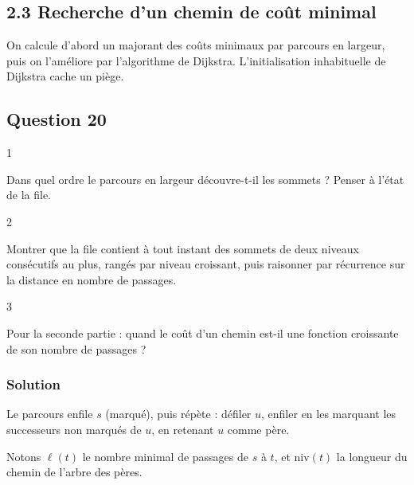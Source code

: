 \documentclass[11pt,a4paper]{article}
\begin{document}
\hypertarget{recherche-dun-chemin-de-couxfbt-minimal}{%
\subsection{2.3 Recherche d'un chemin de coût minimal}\label{recherche-dun-chemin-de-couxfbt-minimal}}

On calcule d'abord un majorant des coûts minimaux par parcours en largeur, puis on l'améliore par l'algorithme de Dijkstra. L'initialisation inhabituelle de Dijkstra cache un piège.

\hypertarget{question-20}{%
\subsection{Question 20}\label{question-20}}

\begin{indication}{1}

Dans quel ordre le parcours en largeur découvre-t-il les sommets ? Penser à l'état de la file.

\end{indication}

\begin{indication}{2}

Montrer que la file contient à tout instant des sommets de deux niveaux consécutifs au plus, rangés par niveau croissant, puis raisonner par récurrence sur la distance en nombre de passages.

\end{indication}

\begin{indication}{3}

Pour la seconde partie : quand le coût d'un chemin est-il une fonction croissante de son nombre de passages ?

\end{indication}

\hypertarget{solution-19}{%
\subsubsection{Solution}\label{solution-19}}

Le parcours enfile \(s\) (marqué), puis répète : défiler \(u\), enfiler en les marquant les successeurs non marqués de \(u\), en retenant \(u\) comme père.

Notons \(\ell(t)\) le nombre minimal de passages de \(s\) à \(t\), et \(\mathrm{niv}(t)\) la longueur du chemin de l'arbre des pères.
\end{document}
